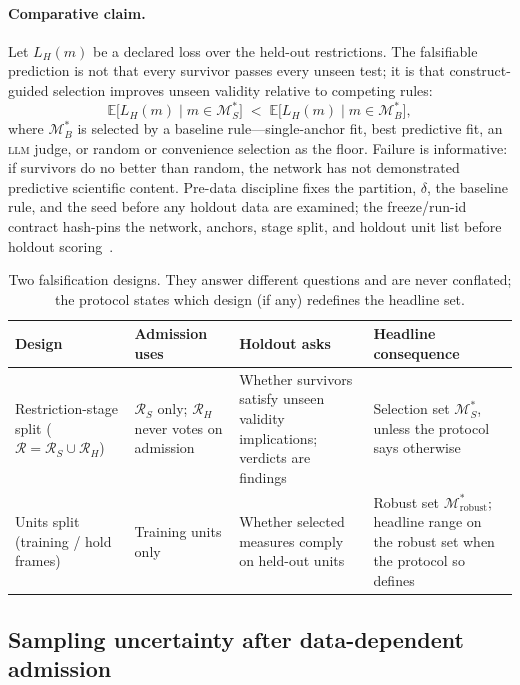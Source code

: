 \documentclass[10pt,letterpaper]{article}
\newcommand{\LLM}{\textsc{llm}}
\newcommand{\M}{\ensuremath{\mathcal{M}}}
\newcommand{\E}{\mathbb{E}}
\newcommand{\Rset}{\mathcal{R}}
\begin{document}
\paragraph{Comparative claim.}
Let $L_H(m)$ be a declared loss over the held-out restrictions.
The falsifiable prediction is not that every survivor passes every unseen test; it is that construct-guided selection improves unseen validity relative to competing rules:
\begin{equation}
\E\bigl[L_H(m)\mid m\in\M^*_S\bigr]
\;<\;
\E\bigl[L_H(m)\mid m\in\M^*_B\bigr],
\label{eq:falsifiable}
\end{equation}
where $\M^*_B$ is selected by a baseline rule---single-anchor fit, best predictive fit, an \LLM{} judge, or random or convenience selection as the floor.
Failure is informative: if survivors do no better than random, the network has not demonstrated predictive scientific content.
Pre-data discipline fixes the partition, $\delta$, the baseline rule, and the seed before any holdout data are examined; the freeze/run-id contract hash-pins the network, anchors, stage split, and holdout unit list before holdout scoring~\cite{cvprofiles}.

\begin{table}[t]
\centering
\small
\caption{Two falsification designs.
They answer different questions and are never conflated; the protocol states which design (if any) redefines the headline set.}
\label{tab:designs}
\begin{tabularx}{\textwidth}{@{}>{\raggedright\arraybackslash}p{2.9cm} X X X@{}}
\toprule
\textbf{Design} & \textbf{Admission uses} & \textbf{Holdout asks} & \textbf{Headline consequence} \\
\midrule
Restriction-stage split ($\Rset=\Rset_S\cup\Rset_H$) & $\Rset_S$ only; $\Rset_H$ never votes on admission & Whether survivors satisfy unseen validity implications; verdicts are findings & Selection set $\M^*_S$, unless the protocol says otherwise \\
Units split (training / hold frames) & Training units only & Whether selected measures comply on held-out units & Robust set $\M^*_{\mathrm{robust}}$; headline range on the robust set when the protocol so defines \\
\bottomrule
\end{tabularx}
\end{table}

\subsection{Sampling uncertainty after data-dependent admission}
\label{sec:uncertainty}
\end{document}

